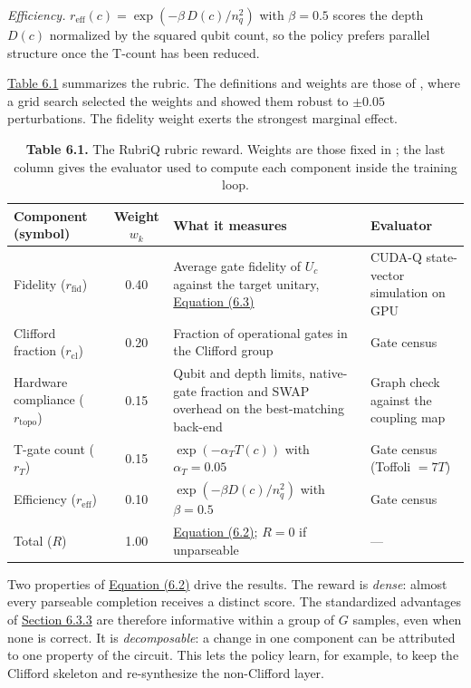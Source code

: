 \documentclass{report}
\theoremstyle{plain}
\theoremstyle{definition}
\theoremstyle{remark}
\begin{document}
\emph{Efficiency.} $r_{\mathrm{eff}}(c)=\exp(-\beta\,D(c)/n_q^{2})$ with $\beta=0.5$ scores the depth $D(c)$ normalized by the squared qubit count, so the policy prefers parallel structure once the T-count has been reduced.

\hyperref[tab:syn:rubric]{Table 6.1} summarizes the rubric. The definitions and weights are those of \cite{guo2026rubriq}, where a grid search selected the weights and showed them robust to $\pm0.05$ perturbations. The fidelity weight exerts the strongest marginal effect.

\begin{table}[htbp]
\caption{\textbf{Table 6.1.} The RubriQ rubric reward. Weights are those fixed in \cite{guo2026rubriq}; the last column gives the evaluator used to compute each component inside the training loop.}
\label{tab:syn:rubric}
 \footnotesize
\begin{tabular}{lcll}
\toprule
Component (symbol) & Weight $w_k$ & What it measures & Evaluator \\
\midrule
Fidelity ($r_{\mathrm{fid}}$) & 0.40 & Average gate fidelity of $U_c$ against the target unitary, \hyperref[eq:syn:fid]{Equation (6.3)} & CUDA-Q state-vector simulation on GPU \\
Clifford fraction ($r_{\mathrm{cl}}$) & 0.20 & Fraction of operational gates in the Clifford group & Gate census \\
Hardware compliance ($r_{\mathrm{topo}}$) & 0.15 & Qubit and depth limits, native-gate fraction and SWAP overhead on the best-matching back-end & Graph check against the coupling map \\
T-gate count ($r_{T}$) & 0.15 & $\exp(-\alpha_T T(c))$ with $\alpha_T=0.05$ & Gate census (Toffoli $=7T$) \\
Efficiency ($r_{\mathrm{eff}}$) & 0.10 & $\exp(-\beta D(c)/n_q^{2})$ with $\beta=0.5$ & Gate census \\
\midrule
Total ($R$) & 1.00 & \hyperref[eq:syn:rubric]{Equation (6.2)}; $R=0$ if unparseable & --- \\
\bottomrule
\end{tabular}
\end{table}

Two properties of \hyperref[eq:syn:rubric]{Equation (6.2)} drive the results. The reward is \emph{dense}: almost every parseable completion receives a distinct score. The standardized advantages of \hyperref[sec:syn:grpo]{Section 6.3.3} are therefore informative within a group of $G$ samples, even when none is correct. It is \emph{decomposable}: a change in one component can be attributed to one property of the circuit. This lets the policy learn, for example, to keep the Clifford skeleton and re-synthesize the non-Clifford layer.
\end{document}
